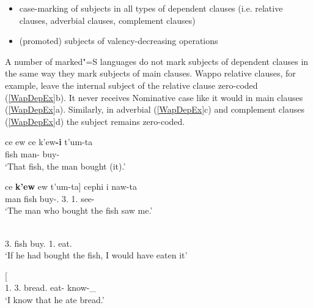 \begin{itemize}
\item case-marking of subjects in all types of dependent clauses (i.e. relative clauses, adverbial clauses, complement clauses)
\item (promoted) subjects of valency-decreasing operations
\end{itemize}

A number of marked"=S languages do not mark subjects of dependent clauses in the same way they mark subjects of main clauses.
Wappo relative clauses, for example, leave the internal subject of the relative clause  zero-coded (\ref{WapDepEx}b). 
It never receives Nominative case like it would in main clauses (\ref{WapDepEx}a). Similarly, in adverbial (\ref{WapDepEx}c) and complement clauses (\ref{WapDepEx}d) the subject remains zero-coded.

\begin{exe}\ex\label{WapDepEx} 
\begin{xlist}
\ex\gll ce ew ce k'ew\textbf{-i} t'um-ta\textglotstop\\
\dem{} fish \dem{} man-\nom{} buy-\pst{}\\
\glt `That fish, the man bought (it).'

\ex \gll  {\rm[}ce \textbf{k'ew} ew t'um-ta{\rm]} cephi i naw-ta\textglotstop\\
\dem{} man fish buy-\pst{}.\dep{} 3\sg{}.\nom{} 1\sg{}.\acc{} see-\pst{}\\
\glt `The man who bought the fish saw me.'

\ex\label{WapCondCl}\gll  {\rm[}    \textipa{cel'}{\rm]}    \\
3\sg{}.\acc{} \dem{} fish buy.\dep{} \cond{} \opt{} 1\sg{}.\nom{} \dem{} eat.\Hyp{}\\
`If he had bought the fish, I would have eaten it' %

\ex\gll{}  {\rm[}\textbf{}  \textipa{pa\textglotstop-tah}{\rm]} \\
1\sg{}.\nom{} 3\sg{}.\acc{} bread.\acc{} eat-\pst{} know-\neu{}\_\fut{}\\
\glt `I know that he ate bread.' 
\end{xlist} 
\end{exe}

